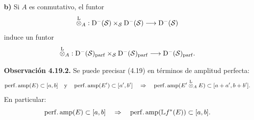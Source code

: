 \textbf{b)} Si \(A\) es conmutativo, el funtor
\[
  \overset{\mathrm L}{\otimes}_A:
  \Dpx^-(\sisi{S}{\mathcal S})\times\sisi{_S}{_{\mathcal S}}\Dpx^-(\sisi{S}{\mathcal S})
  \longrightarrow \Dpx^-(\sisi{S}{\mathcal S})
\]
induce un funtor
\[
  \overset{\mathrm L}{\otimes}_A:
  \Dpx^-(\sisi{S}{\mathcal S})_{\mathrm{parf}}\times\sisi{_S}{_{\mathcal S}}\Dpx^-(\sisi{S}{\mathcal S})_{\mathrm{parf}}
  \longrightarrow \Dpx^-(\sisi{S}{\mathcal S})_{\mathrm{parf}}.
\]

\textbf{Observación 4.19.2.} Se puede precisar (4.19) en términos de amplitud perfecta:
\[
  \perfamp(E)\subset[a,b]\quad\text{y}\quad
  \perfamp(E')\subset[a',b']
  \quad\Rightarrow\quad
  \perfamp(E'\overset{\mathrm L}{\otimes}_A E)\subset[a+a',b+b'].
\]
En particular:
\[
  \perfamp(E)\subset[a,b]
  \quad\Rightarrow\quad
  \perfamp(\mathbb L f^*(E))\subset[a,b].
\]

